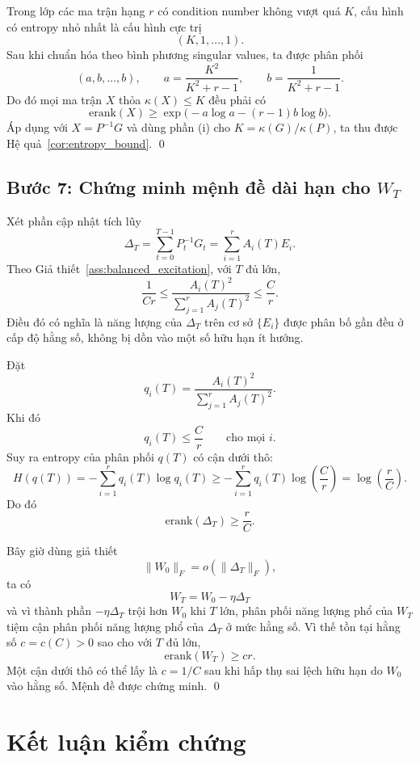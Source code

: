 \documentclass[11pt,a4paper]{article}
\newcommand{\erank}{\mathrm{erank}}
\begin{document}
Trong lớp các ma trận hạng $r$ có condition number không vượt quá $K$, cấu hình có entropy nhỏ nhất là cấu hình cực trị
\[
(K,1,\ldots,1).
\]
Sau khi chuẩn hóa theo bình phương singular values, ta được phân phối
\[
(a,b,\ldots,b),
\qquad
a = \frac{K^2}{K^2+r-1},
\qquad
b = \frac{1}{K^2+r-1}.
\]
Do đó mọi ma trận $X$ thỏa $\kappa(X) \le K$ đều phải có
\[
\erank(X) \ge \exp\!\bigl(-a\log a -(r-1)b\log b\bigr).
\]
Áp dụng với $X = P^{-1}G$ và dùng phần (i) cho $K = \kappa(G)/\kappa(P)$, ta thu được Hệ quả~\ref{cor:entropy_bound}. \qed

\subsection{Bước 7: Chứng minh mệnh đề dài hạn cho $W_T$}

Xét phần cập nhật tích lũy
\[
\Delta_T = \sum_{t=0}^{T-1} P_t^{-1}G_t = \sum_{i=1}^r A_i(T)E_i.
\]
Theo Giả thiết~\ref{ass:balanced_excitation}, với $T$ đủ lớn,
\[
\frac{1}{Cr} \le \frac{A_i(T)^2}{\sum_{j=1}^r A_j(T)^2} \le \frac{C}{r}.
\]
Điều đó có nghĩa là năng lượng của $\Delta_T$ trên cơ sở $\{E_i\}$ được phân bố gần đều ở cấp độ hằng số, không bị dồn vào một số hữu hạn ít hướng.

Đặt
\[
q_i(T) = \frac{A_i(T)^2}{\sum_{j=1}^r A_j(T)^2}.
\]
Khi đó
\[
q_i(T) \le \frac{C}{r}
\qquad \text{cho mọi } i.
\]
Suy ra entropy của phân phối $q(T)$ có cận dưới thô:
\[
H(q(T)) = -\sum_{i=1}^r q_i(T)\log q_i(T)
\ge -\sum_{i=1}^r q_i(T)\log\!\left(\frac{C}{r}\right)
= \log\!\left(\frac{r}{C}\right).
\]
Do đó
\[
\erank(\Delta_T) \ge \frac{r}{C}.
\]

Bây giờ dùng giả thiết
\[
\|W_0\|_F = o(\|\Delta_T\|_F),
\]
ta có
\[
W_T = W_0 - \eta \Delta_T
\]
và vì thành phần $-\eta\Delta_T$ trội hơn $W_0$ khi $T$ lớn, phân phối năng lượng phổ của $W_T$ tiệm cận phân phối năng lượng phổ của $\Delta_T$ ở mức hằng số. Vì thế tồn tại hằng số $c = c(C) > 0$ sao cho với $T$ đủ lớn,
\[
\erank(W_T) \ge c r.
\]
Một cận dưới thô có thể lấy là $c = 1/C$ sau khi hấp thụ sai lệch hữu hạn do $W_0$ vào hằng số. Mệnh đề được chứng minh. \qed

\section{Kết luận kiểm chứng}
\end{document}
